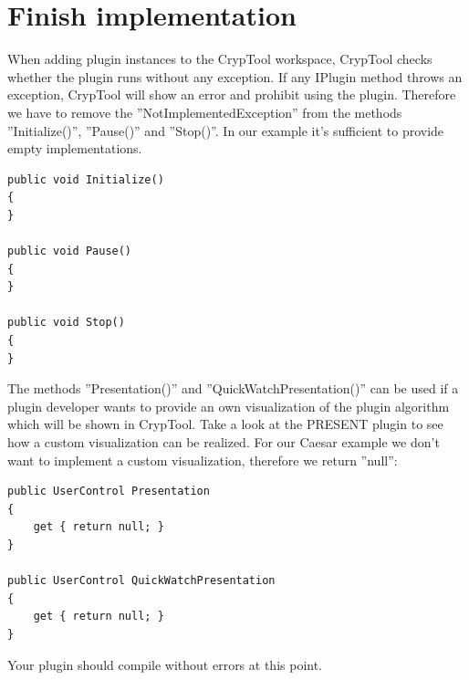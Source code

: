 \section{Finish implementation}\label{sec:FinishImplementation}
When adding plugin instances to the CrypTool workspace, CrypTool checks whether the plugin runs without any exception. If any IPlugin method throws an exception, CrypTool will show an error and prohibit using the plugin. Therefore we have to remove the ''NotImplementedException'' from the methods ''Initialize()'', ''Pause()'' and ''Stop()''. In our example it's sufficient to provide empty implementations.
\begin{lstlisting}
public void Initialize()
{
}

public void Pause()
{
}

public void Stop()
{
}
\end{lstlisting}
The methods ''Presentation()'' and ''QuickWatchPresentation()'' can be used if a plugin developer wants to provide an own visualization of the plugin algorithm which will be shown in CrypTool. Take a look at the PRESENT plugin to see how a custom visualization can be realized. For our Caesar example we don't want to implement a custom visualization, therefore we return ''null'':
\begin{lstlisting}
public UserControl Presentation
{
	get { return null; }
}

public UserControl QuickWatchPresentation
{
	get { return null; }
}
\end{lstlisting}
Your plugin should compile without errors at this point.\clearpage

